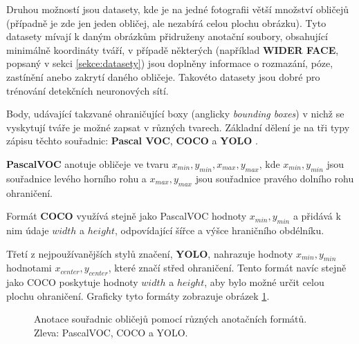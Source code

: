 Druhou možností jsou datasety, kde je na jedné fotografii větší množství obličejů (případně je zde jen jeden obličej, ale nezabírá celou plochu obrázku). Tyto datasety mívají k daným obrázkům přidruženy anotační soubory, obsahující minimálně koordináty tváří, v případě některých (například \textbf{WIDER FACE}, popsaný v sekci \ref{sekce:datasety}) jsou doplněny informace o rozmazání, póze, zastínění anebo zakrytí daného obličeje. Takovéto datasety jsou dobré pro trénování detekčních neuronových sítí.

Body, udávající takzvané ohraničující boxy (anglicky \emph{bounding boxes}) v nichž se vyskytují tváře je možné zapsat v různých tvarech. Základní dělení je na tři typy zápisu těchto souřadnic: \textbf{Pascal VOC}, \textbf{COCO} a \textbf{YOLO} \cite{annotace_formaty}.

\textbf{PascalVOC} anotuje obličeje ve tvaru $x_{min}, y_{min}, x_{max}, y_{max}$, kde $x_{min}, y_{min}$ jsou souřadnice levého horního rohu a $x_{max}, y_{max}$ jsou souřadnice pravého dolního rohu ohraničení. 

Formát \textbf{COCO} využívá stejně jako PascalVOC hodnoty $x_{min}, y_{min}$ a přidává k nim údaje $width$ a $height$, odpovídající šířce a výšce hraničního obdélníku. 

Třetí z nejpoužívanějších stylů značení, \textbf{YOLO}, nahrazuje hodnoty $x_{min}, y_{min}$ hodnotami $x_{center}, y_{center}$, které značí střed ohraničení. Tento formát navíc stejně jako COCO poskytuje hodnoty $width$ a $height$, aby bylo možné určit celou plochu ohraničení. Graficky tyto formáty zobrazuje obrázek \ref{obrazek:annotace_formaty}.

\begin{figure}[H]
  \begin{center}
  \label{obrazek:annotace_formaty}
  \caption{Anotace souřadnic obličejů pomocí různých anotačních formátů. Zleva: PascalVOC, COCO a YOLO.}
  \end{center}
\end{figure}
 
